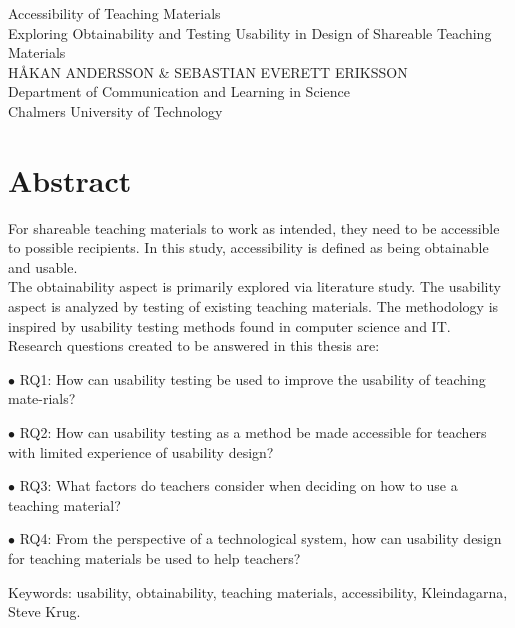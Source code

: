 Accessibility of Teaching Materials\\
Exploring Obtainability and Testing Usability in Design of Shareable Teaching Materials\\
HÅKAN ANDERSSON \& SEBASTIAN EVERETT ERIKSSON\\
Department of Communication and Learning in Science\\
Chalmers University of Technology \setlength{\parskip}{0.5cm}

\thispagestyle{plain}			%
\setlength{\parskip}{0pt plus 1.0pt}
\section*{Abstract}
For shareable teaching materials to work as intended, they need to be accessible to possible recipients. In this study, accessibility is defined as being obtainable and usable. \\[0.5cm]
The obtainability aspect is primarily explored via literature study. The usability aspect is analyzed by testing of existing teaching materials. The methodology is inspired by usability testing methods found in computer science and IT. \\[0.5cm]
Research questions created to be answered in this thesis are:
\begin{description}
    \item $\bullet$ RQ1: How can usability testing be used to improve the usability of teaching mate-rials?
    \item $\bullet$ RQ2: How can usability testing as a method be made accessible for teachers with limited experience of usability design?
    \item $\bullet$ RQ3: What factors do teachers consider when deciding on how to use a teaching material?
    \item $\bullet$ RQ4: From the perspective of a technological system, how can usability design for teaching materials be used to help teachers?
\end{description}


\vfill
Keywords: usability, obtainability, teaching materials, accessibility, Kleindagarna, Steve Krug.

\newpage				%
\thispagestyle{empty}
\mbox{}